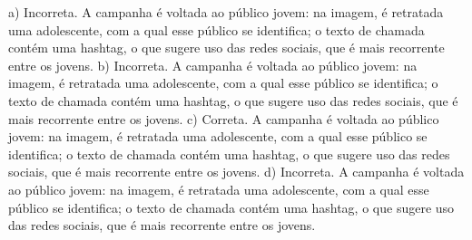 \begin{enumerate}
a) Incorreta. A campanha é voltada ao público jovem: na imagem, é retratada 
uma adolescente, com a qual esse público se identifica; o texto de 
chamada contém uma hashtag, o que sugere uso das redes sociais, que é mais
recorrente entre os jovens.  
b) Incorreta. A campanha é voltada ao público jovem: na imagem, é retratada 
uma adolescente, com a qual esse público se identifica; o texto de 
chamada contém uma hashtag, o que sugere uso das redes sociais, que é mais
recorrente entre os jovens.  
c) Correta. A campanha é voltada ao público jovem: na imagem, é retratada 
uma adolescente, com a qual esse público se identifica; o texto de 
chamada contém uma hashtag, o que sugere uso das redes sociais, que é mais
recorrente entre os jovens.  
d) Incorreta. A campanha é voltada ao público jovem: na imagem, é retratada 
uma adolescente, com a qual esse público se identifica; o texto de 
chamada contém uma hashtag, o que sugere uso das redes sociais, que é mais
recorrente entre os jovens.

\end{enumerate}


